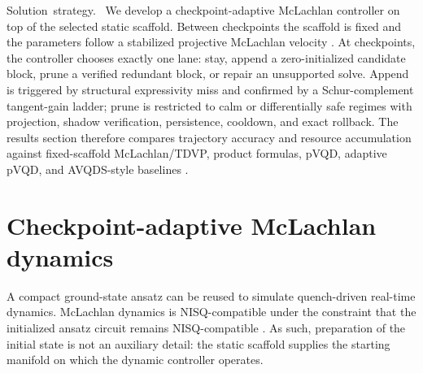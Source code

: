 \documentclass[
  reprint,
  amsmath,
  amssymb,
  aps,
  pra,
  nofootinbib,
  superscriptaddress,
  floatfix
]{revtex4-2}
\newcommand{\placeholder}[1]{\textcolor{red!70!black}{\ifmmode\left[#1\right]\else\textsf{[#1]}\fi}}
\newcommand{\tentative}[1]{\textcolor{red!70!black}{#1}}
\newcommand{\structlabel}[1]{\noindent\mbox{\tentative{#1.}}~}
\begin{document}
\structlabel{Solution strategy}
We develop a checkpoint-adaptive McLachlan controller on top of the selected static scaffold.  Between checkpoints the scaffold is fixed and the parameters follow a stabilized projective McLachlan velocity \cite{McLachlan1964,Yuan2019VQS,Barison2021}. %
At checkpoints, the controller chooses exactly one lane: stay, append a zero-initialized candidate block, prune a verified redundant block, or repair an unsupported solve.  Append is triggered by structural expressivity miss and confirmed by a Schur-complement tangent-gain ladder; prune is restricted to calm or differentially safe regimes with projection, shadow verification, persistence, cooldown, and exact rollback.  The results section therefore compares trajectory accuracy and resource accumulation against fixed-scaffold McLachlan/TDVP, product formulas, pVQD, adaptive pVQD, and AVQDS-style baselines \cite{Barison2021,Yao2021,Linteau2024,Zhang2025,Campbell2019QDRIFT}. %

\section{Checkpoint-adaptive McLachlan dynamics}
\label{sec:dynamics_method}

A compact ground-state ansatz can be reused to simulate quench-driven real-time dynamics. McLachlan dynamics is NISQ-compatible under the constraint that the initialized ansatz circuit remains NISQ-compatible \cite{McLachlan1964,LiBenjamin2017VQS,Yuan2019VQS}. %
As such, preparation of the initial state is not an auxiliary detail: the static scaffold supplies the starting manifold on which the dynamic controller operates.
\end{document}

